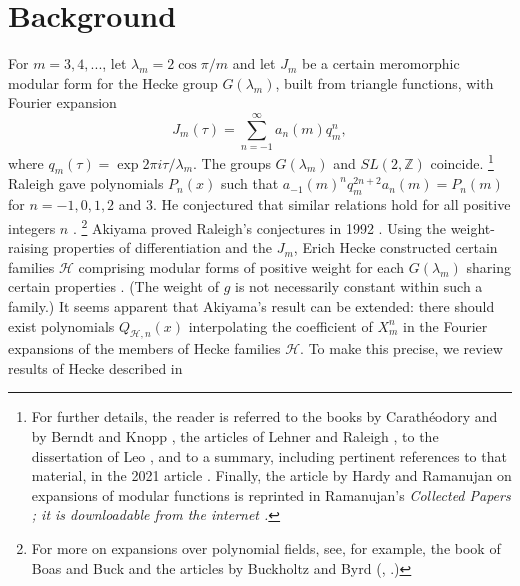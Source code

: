 \documentclass{article}
\begin{document}
\section{Background}
For $m = 3, 4, ...$,
let $\lambda_m = 2 \cos \pi/m$ and
let $J_m$ be a certain meromorphic
modular form for the Hecke group $G(\lambda_m)$,
built from triangle functions, 
with Fourier expansion
$$
J_m(\tau) = \sum_{n=-1}^\infty a_n(m)q_m^n,
$$
where
$q_m(\tau) = \exp 2 \pi i \tau/\lambda_m$.
The groups $G(\lambda_m)$ and $
SL(2,\mathbb{Z})$ coincide.
\footnote{For further details, the reader
is referred to the books by 
 Carath{\'e}odory
\cite{caratheodory1, caratheodory2}
and by Berndt and Knopp
\cite{berndt2008hecke},
the articles of Lehner and Raleigh
\cite{lehner1954note, raleigh1962fourier},
to the dissertation of Leo 
\cite{leo2008fourier}, and to a
summary, including pertinent references
to that material, in the
2021 article \cite{interpolating}.  
Finally, the article by Hardy and Ramanujan
on expansions of
modular functions
is reprinted
in Ramanujan's \it Collected Papers \rm
\cite{ramanujan2015collected}; it is
downloadable from the internet
\cite{HardyDownload}.}
\newline \newline \noindent
Raleigh gave polynomials $P_n(x)$ such that 
$a_{-1}(m)^n q_m^{2n+2} a_n(m) = P_n(m)$
for  $n = -1, 0, 1, 2$ and $3$.
He conjectured that similar 
relations hold for all positive integers
$n$ \cite{raleigh1962fourier}.
\footnote{For more on
expansions over polynomial fields, see, for 
example, the book of Boas and Buck 
\cite{boas2013polynomial} and the articles 
by Buckholtz and Byrd (\cite{buckholtz1973series},
\cite{byrd}.)}
Akiyama proved Raleigh's conjectures
in 1992 \cite{akiyama1992note}.
\newline \newline \noindent
Using the weight-raising properties of 
differentiation and the $J_m$, Erich
Hecke constructed
certain families 
$\mathcal{H}$
comprising modular forms 
of positive weight
for each $G(\lambda_m)$
sharing certain properties 
\cite{hecke1936, berndt2008hecke}. 
(The weight of $g$ is not necessarily
constant within such a family.)
It seems apparent that Akiyama's 
result can be extended:
there should exist polynomials 
$Q_{\mathcal{H},n}(x)$ 
interpolating the coefficient of $X_m^n$
in the Fourier expansions of the
members of Hecke families
$\mathcal{H}$. 
\newline \newline \noindent
To make this precise, we review 
results of Hecke described in
\end{document}
